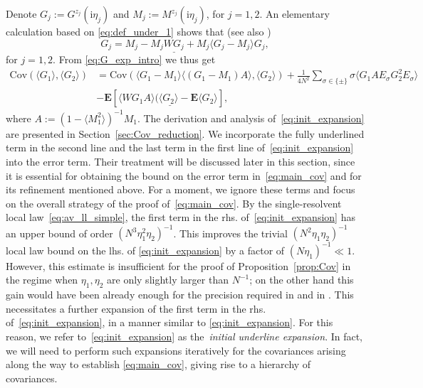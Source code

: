 \documentclass[10pt]{amsart}
\numberwithin{equation}{section}
\newcommand{\E}{\mathbf{E}}
\newcommand{\Cov}{\mathrm{Cov}}
\newcommand{\ii}{\mathrm{i}}
\begin{document}
Denote $G_j:=G^{z_j}(\ii\eta_j)$ and $M_j:=M^{z_j}(\ii\eta_j)$, for $j=1,2$. An elementary calculation based on \eqref{eq:def_under_1} shows that (see also \cite[Eq.(5.2)]{macroCLT_complex})
\begin{equation}
G_j=M_j-M_j\underline{WG_j}+M_j\langle G_j-M_j\rangle G_j,
\label{eq:G_exp_intro}
\end{equation}
for $j=1,2$. From \eqref{eq:G_exp_intro} we thus get
\begin{equation}
\begin{split}
\Cov\left(\langle G_1\rangle,\langle G_2\rangle\right) &= \Cov\left(\langle G_1-M_1\rangle \langle (G_1-M_1)A\rangle,\langle G_2\rangle\right) + \frac{1}{4N^2} \sum_{\sigma\in\{\pm\}} \sigma\langle G_1AE_\sigma G_2^2 E_\sigma\rangle\\
& -\E \left[ \langle \underline{WG_1A\rangle (\langle G_2\rangle -\E \langle G_2\rangle}\right],
\end{split}
\label{eq:init_expansion}
\end{equation}
where $A:=(1-\langle M_1^2\rangle)^{-1}M_1$. The derivation and analysis of~\eqref{eq:init_expansion} are presented in Section~\ref{sec:Cov_reduction}. We incorporate the fully underlined term in the second line and the last term in the first line of~\eqref{eq:init_expansion} into the error term. Their treatment will be discussed later in this section, since it is essential for obtaining the bound on the error term in~\eqref{eq:main_cov} and for its refinement mentioned above. For a moment, we ignore these terms and focus on the overall strategy of the proof of~\eqref{eq:main_cov}. By the single-resolvent local law~\eqref{eq:av_ll_simple}, the first term in the rhs. of~\eqref{eq:init_expansion} has an upper bound of order $(N^3\eta_1^2\eta_2)^{-1}$. This improves the trivial $(N^2\eta_1\eta_2)^{-1}$ local law bound on the lhs. of \eqref{eq:init_expansion} by a factor of $(N\eta_1)^{-1}\ll 1$. However, this estimate is insufficient for the proof of Proposition~\ref{prop:Cov} in the regime when $\eta_1,\eta_2$ are only slightly larger than $N^{-1}$; on the other hand this gain would have been already enough for the precision required in \cite[Proposition~3.3]{macroCLT_complex} and in \cite[Proposition~3.4]{Cipolloni_meso}. This necessitates a further expansion of the first term in the rhs. of~\eqref{eq:init_expansion}, in a manner similar to \eqref{eq:init_expansion}. For this reason, we refer to~\eqref{eq:init_expansion} as the~\emph{initial underline expansion}. In fact, we will need to perform such expansions iteratively for the covariances arising along the way to establish \eqref{eq:main_cov}, giving rise to a hierarchy of covariances. 
\end{document}
